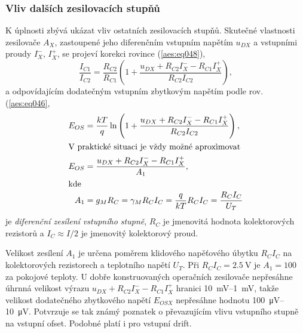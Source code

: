       \subsubsection{Vliv dalších zesilovacích stupňů}\label{aesIchIIIsecIIIssecVIII}
        K úplnosti zbývá ukázat vliv ostatních zesilovacích stupňů. Skutečné vlastnosti zesilovače
        \(A_X\), zastoupené jeho diferenčním vstupním napětím \(u_{DX}\) a vstupními proudy
        \(I_X^-\), \(I_X^+\), se projeví korekci rovince (\ref{aes:eq048}),
        \begin{equation*}
          \dfrac{I_{C1}}{I_{C2}} = \dfrac{R_{C2}}{R_{C1}}
          \left(1 + \dfrac{u_{DX} + R_{C2}I_X^- - R_{C1}I_X^+}{R_{C2}I_{C2}}\right),
        \end{equation*}
        a odpovídajícím dodatečným vstupním zbytkovým napětím podle rov. (\ref{aes:eq046},
        \begin{subequations}\label{aes:eq063}
          \begin{align}
            E_{OS} &= \dfrac{kT}{q}\ln
            \left(1 + 
              \dfrac{u_{DX} + R_{C2}I_X^- - R_{C1}I_X^+}{R_{C2}I_{C2}}
            \right),                                                         \label{aes:eq063a}  \\
            \shortintertext{V praktické situaci je vždy možné aproxìmovat}
            E_{OS} &= \dfrac{u_{DX} + R_{C2}I_X^- - R_{C1}I_X^+}{A_1},       \label{aes:eq063b}  \\
            \shortintertext{kde}
            A_1   &= g_MR_C = \gamma_MR_CI_C 
                   = \dfrac{q}{kT}R_CI_C = \dfrac{R_CI_C}{U_T}               \label{aes:eq063c}
          \end{align}
        \end{subequations}
        je \emph{diferenční zesílení vstupního stupně}, \(R_C\) je jmenovitá hodnota kolektorových
        rezistorů a \(I_C \approx I/2\) je jmenovitý kolektorový proud.

        Velikost zesílení \(A_1\) je určena poměrem klidového napěťového úbytku \(R_CI_C\) na
        kolektorových rezistorech a teplotního napětí \(U_T\). Při \(R_CI_C = \SI{2.5}{\V}\) je
        \(A_1 = 100\) za pokojové teploty. U dobře konstruovaných operačních zesilovače nepřesáhne
        úhrnná velikost výrazu \(u_{DX} + R_{C2}I_X^- - R_{C1}I_X^+\) hranici \SIrange{10}{1}{\mV},
        takže velikost dodatečného zbytkového napětí \(E_{OSX}\) nepřesáhne hodnotu
        \SIrange{100}{10}{\uV}. Potvrzuje se tak známý poznatek o převazujícím vlivu vstupního
        stupně na vstupní ofset. Podobné platí i pro vstupní drift.

